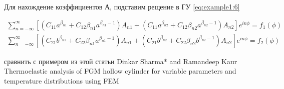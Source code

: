 Для нахождение коэффициентов А, подставим рещение в ГУ \cref{eq:example1:6}

\begin{equation*}
\begin{split}
\sum_{n=-\infty}^{\infty} \left [ \left (C_{11} a^{\beta_{n1}} +C_{12} \beta_{n1} a^{\beta_{n1} -1} \right ) A_{n1}  +\left (C_{11} a^{\beta_{n2}} +C_{12} \beta_{n2} a^{\beta_{n2} -1} \right ) A_{n2} \right ] e^{in\phi} = f_1(\phi) \\
\sum_{n=-\infty}^{\infty} \left [ \left (C_{21} b^{\beta_{n1}} +C_{22} \beta_{n1} a^{\beta_{n1} -1} \right ) A_{n1}  +\left (C_{21} b^{\beta_{n2}} +C_{22} \beta_{n2} b^{\beta_{n2} -1} \right ) A_{n2} \right ] e^{in\phi} = f_2(\phi)
\end{split}
\end{equation*}


сравнить с примером из этой статьи
Dinkar Sharma* and Ramandeep Kaur
Thermoelastic analysis of FGM hollow cylinder for
variable parameters and temperature
distributions using FEM